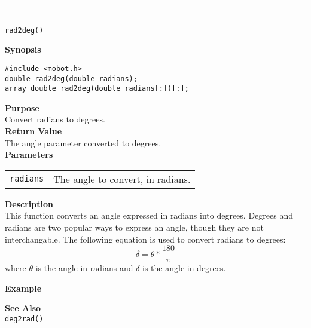 \noindent
\vspace{5pt}
\rule{4.5in}{0.015in}\\
\noindent
{\LARGE \texttt{rad2deg()}}\\
{}

\noindent
{\bf Synopsis}
\vspace{-8pt}
\begin{verbatim}
#include <mobot.h>
double rad2deg(double radians);
array double rad2deg(double radians[:])[:];
\end{verbatim}

\noindent
{\bf Purpose}\\
Convert radians to degrees.\\

\noindent
{\bf Return Value}\\
The angle parameter converted to degrees.\\

\noindent
{\bf Parameters}
\vspace{-0.1in}
\begin{description}
\item               
\begin{tabular}{p{15 mm}p{145 mm}}
\texttt{radians} & The angle to convert, in radians. \\
\end{tabular}
\end{description}

\noindent
{\bf Description}\\
This function converts an angle expressed in radians into degrees. Degrees and
radians are two popular ways to express an angle, though they are not interchangable.
The following equation is used to convert radians to degrees:
\begin{equation*}
\delta = \theta * \frac{180}{\pi}
\end{equation*}
where $\theta$ is the angle in radians and $\delta$ is the angle in degrees.

\noindent
{\bf Example}\\
\noindent

\noindent
{\bf See Also}\\
\texttt{deg2rad()}

